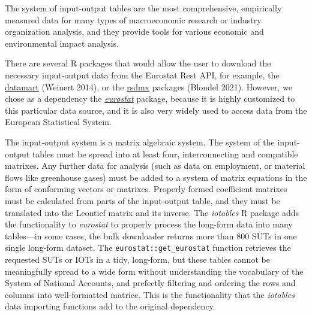 \documentclass[
]{article}
\begin{document}
The system of input-output tables are the most comprehensive,
empirically measured data for many types of macroeconomic research or
industry organization analysis, and they provide tools for various
economic and environmental impact analysis.

There are several R packages that would allow the user to download the
necessary input-output data from the Eurostat Rest API, for example, the
\href{https://cran.r-project.org/web/packages/datamart/index.html}{datamart}
(Weinert 2014), or the
\href{https://cran.r-project.org/web/packages/rsdmx/index.html}{rsdmx}
packages (Blondel 2021). However, we chose as a dependency the
\href{https://cran.r-project.org/web/packages/eurostat/}{\emph{eurostat}}
package, because it is highly customized to this particular data source,
and it is also very widely used to access data from the European
Statistical System.

The input-output system is a matrix algebraic system. The system of the
input-output tables must be spread into at least four, interconnecting
and compatible matrixes. Any further data for analysis (such as data on
employment, or material flows like greenhouse gases) must be added to a
system of matrix equations in the form of conforming vectors or
matrixes. Properly formed coefficient matrixes must be calculated from
parts of the input-output table, and they must be translated into the
Leontief matrix and its inverse. The \emph{iotables} R package adds the
functionality to \emph{eurostat} to properly process the long-form data
into many tables---in some cases, the bulk downloader returns more than
800 SUTs in one single long-form dataset. The
\texttt{eurostat::get\_eurostat} function retrieves the requested SUTs
or IOTs in a tidy, long-form, but these tables cannot be meaningfully
spread to a wide form without understanding the vocabulary of the System
of National Accounts, and prefectly filtering and ordering the rows and
columns into well-formatted matrice. This is the functionality that the
\emph{iotables} data importing functions add to the original dependency.
\end{document}
